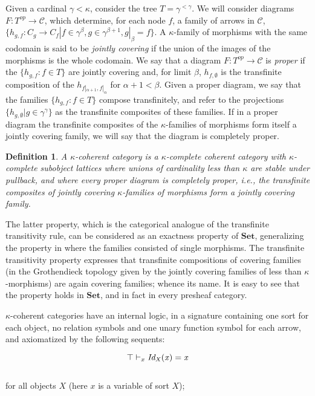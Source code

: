 \documentclass[a4paper,11pt]{article}
\theoremstyle{plain}
\theoremstyle{plain}
\newtheorem{defs}[thm]{Definition}
\theoremstyle{remark}
\newcommand{\Sets}{\ensuremath{\mathbf{Set}}}
\begin{document}
Given a cardinal $\gamma<\kappa$, consider the tree $T=\gamma^{<\gamma}$. We will consider diagrams $F: T^{op} \to \mathcal{C}$, which determine, for each node $f$, a family of arrows in $\mathcal{C}$, $\{h_{g, f}: C_{g} \to C_{f} | f \in \gamma^{\beta}, g \in \gamma^{\beta+1}, g|_{\beta}=f\}$. A $\kappa$-family of morphisms with the same codomain is said to be \emph{jointly covering} if the union of the images of the morphisms is the whole codomain. We say that a diagram $F: T^{op} \to \mathcal{C}$ is \emph{proper} if the $\{h_{g, f}: f \in T\}$ are jointly covering and, for limit $\beta$, $h_{f, \emptyset}$ is the transfinite composition of the $h_{f|_{\alpha+1}, f|_{\alpha}}$ for $\alpha+1<\beta$. Given a proper diagram, we say that the families $\{h_{g, f}: f \in T\}$ compose transfinitely, and refer to the projections $\{h_{g, \emptyset} | g \in \gamma^{\gamma}\}$ as the transfinite composites of these families. If in a proper diagram the transfinite composites of the $\kappa$-families of morphisms form itself a jointly covering family, we will say that the diagram is completely proper.

\begin{defs}
 A $\kappa$-coherent category is a $\kappa$-complete coherent category with $\kappa$-complete subobject lattices where unions of cardinality less than $\kappa$ are stable under pullback, and where every proper diagram is completely proper, i.e., the transfinite composites of jointly covering $\kappa$-families of morphisms form a jointly covering family.
\end{defs}

The latter property, which is the categorical analogue of the transfinite transitivity rule, can be considered as an exactness property of $\Sets$, generalizing the property in \cite{makkai} where the families consisted of single morphisms. The transfinite transitivity property expresses that transfinite compositions of covering families (in the Grothendieck topology given by the jointly covering families of less than $\kappa$-morphisms) are again covering families; whence its name. It is easy to see that the property holds in \Sets, and in fact in every presheaf category.

$\kappa$-coherent categories have an internal logic, in a signature containing one sort for each object, no relation symbols and one unary function symbol for each arrow, and axiomatized by the following sequents:

$$\top \vdash_x \it Id_X(x)=x$$
\\
for all objects $X$ (here $x$ is a variable of sort $X$);
\end{document}
